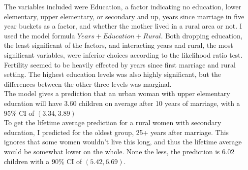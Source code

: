 \documentclass[11pt]{article}
\theoremstyle{definition}
\begin{document}
\begin{itemize}
        The variables included were Education, a factor indicating no education, lower elementary, upper elementary, or secondary and up, years since marriage in five year buckets as a factor, and whether the mother lived in a rural area or not. I used the model formula $Years + Education + Rural$. Both dropping education, the least significant of the factors, and interacting years and rural, the most significant variables, were inferior choices according to the likelihood ratio test. Fertility seemed to be heavily effected by years since first marriage and rural setting. The highest education levels was also highly significant, but the differences between the other three levels was marginal. \vspace{2mm}\\
        The model gives a prediction that an urban woman with upper elementary education will have 3.60 children on average after 10 years of marriage, with a $95\%$ CI of \((3.34,3.89)\) \vspace{2mm} \\
        To get the lifetime average prediction for a rural women with secondary education, I predicted for the oldest group, 25+ years after marriage. This ignores that some women wouldn't live this long, and thus the lifetime average would be somewhat lower on the whole. None the less, the prediction is 6.02 children with a $90\%$ CI of \((5.42,6.69)\).

\end{itemize}
\end{document}
